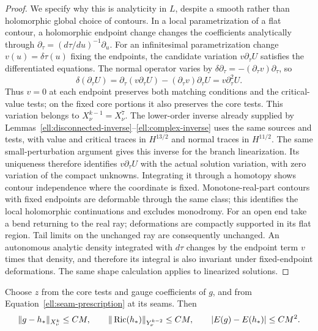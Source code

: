 \begin{proof}
We specify why this is analyticity in $L$, despite a smooth rather
than holomorphic global choice of contours.  In a local
parametrization of a flat contour, a holomorphic endpoint change
changes the coefficients analytically through
$\partial_\tau=(d\tau/du)^{-1}\partial_u$.
For an infinitesimal parametrization change $v(u)=\delta\tau(u)$
fixing the endpoints, the candidate variation $v\partial_\tau U$
satisfies the differentiated equations.  The normal operator varies
by $\delta\partial_\tau=-(\partial_\tau v)\partial_\tau$, so
\[
 \delta(\partial_\tau U)
 =\partial_\tau(v\partial_\tau U)
   -(\partial_\tau v)\partial_\tau U
 =v\partial_\tau^2U.
\]
Thus $v=0$ at each endpoint preserves both matching conditions and
the critical-value tests; on the fixed core portions it also preserves
the core tests.  This variation belongs to $X^{k-1}_\nu=X^7_\nu$.
The lower-order inverse already supplied by
Lemmas~\ref{ell:disconnected-inverse}--\ref{ell:complex-inverse}
uses the same sources and tests, with value and critical traces in
$H^{13/2}$ and normal traces in $H^{11/2}$.  The same small-perturbation
argument gives this inverse for the branch linearization.  Its
uniqueness therefore identifies $v\partial_\tau U$ with the actual
solution variation, with zero variation of the compact unknowns.
Integrating it through a homotopy shows contour independence
where the coordinate is fixed.  Monotone-real-part contours with
fixed endpoints are deformable through the same class; this
identifies the local holomorphic continuations and excludes
monodromy.  For an open end take a bend returning to the real ray;
deformations are compactly supported in its flat region.  Tail
limits on the unchanged ray are consequently unchanged.  An
autonomous analytic density integrated with $d\tau$ changes by
the endpoint term $v$ times that density, and therefore its
integral is also invariant under fixed-endpoint deformations.
The same shape calculation applies to linearized solutions.
\end{proof}

\begin{lemma}
\label{ell:comparison}
Choose $z$ from the core tests and gauge coefficients of $g$, and
from Equation~\eqref{ell:seam-prescription} at its seams.  Then
\begin{equation}
 \|g-h_*\|_{X^k_\nu}\le CM,\qquad
 \|\operatorname{Ric}(h_*)\|_{Y^{k-2}_\nu}\le CM,\qquad
 |E(g)-E(h_*)|\le CM^2.
 \label{ell:comparison-estimates}
\end{equation}
\end{lemma}

